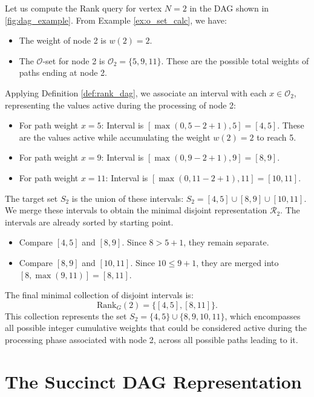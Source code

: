\begin{example}
    \label{ex:rank_calc_disjoint}
    Let us compute the Rank query for vertex $N=2$ in the DAG shown in \autoref{fig:dag_example}. From Example \ref{ex:o_set_calc}, we have:
    \begin{itemize}
        \item The weight of node 2 is $w(2) = 2$.
        \item The $\mathcal{O}$-set for node 2 is $\mathcal{O}_2 = \{ 5, 9, 11 \}$. These are the possible total weights of paths ending at node 2.
    \end{itemize}
    Applying Definition \ref{def:rank_dag}, we associate an interval with each $x \in \mathcal{O}_2$, representing the values active during the processing of node 2:
    \begin{itemize}
        \item For path weight $x=5$: Interval is $[\max(0, 5 - 2 + 1), 5] = [4, 5]$. These are the values active while accumulating the weight $w(2)=2$ to reach 5.
        \item For path weight $x=9$: Interval is $[\max(0, 9 - 2 + 1), 9] = [8, 9]$.
        \item For path weight $x=11$: Interval is $[\max(0, 11 - 2 + 1), 11] = [10, 11]$.
    \end{itemize}
    The target set $S_2$ is the union of these intervals: $S_2 = [4, 5] \cup [8, 9] \cup [10, 11]$.
    We merge these intervals to obtain the minimal disjoint representation $\mathcal{R}_2$. The intervals are already sorted by starting point.
    \begin{itemize}
        \item Compare $[4, 5]$ and $[8, 9]$. Since $8 > 5 + 1$, they remain separate.
        \item Compare $[8, 9]$ and $[10, 11]$. Since $10 \le 9 + 1$, they are merged into $[8, \max(9, 11)] = [8, 11]$.
    \end{itemize}
    The final minimal collection of disjoint intervals is:
    \[ \mathrm{Rank}_G(2) = \{ [4, 5], [8, 11] \}. \]
    This collection represents the set $S_2 = \{4, 5\} \cup \{8, 9, 10, 11\}$, which encompasses all possible integer cumulative weights that could be considered active during the processing phase associated with node 2, across all possible paths leading to it.
\end{example}

\section{The Succinct DAG Representation}
\label{sec:succinct_dag_representation}

